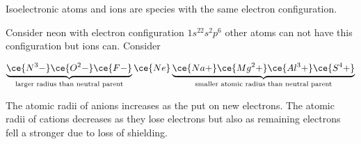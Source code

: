 \documentclass[../mit-general-chemistry.tex]{subfiles}
\begin{document}
Isoelectronic atoms and ions are species with the same electron
configuration.

Consider neon with electron configuration $1s^22s^2p^6$ other atoms
can not have this configuration but ions can. Consider

\begin{equation*}
  \underbrace{\ce{N^3-} \ce{O^2-} \ce{F-}}_{\text{larger radius than neutral parent}}
  \ce{Ne}
  \underbrace{\ce{Na+} \ce{Mg^2+} \ce{Al^3+} \ce{S^4+}}_{\text{smaller atomic radius than neutral parent}}
\end{equation*}

The atomic radii of anions increases as the put on new electrons. The
atomic radii of cations decreases as they lose electrons but also as
remaining electrons fell a stronger \Zeff due to loss of shielding.





\end{document}
